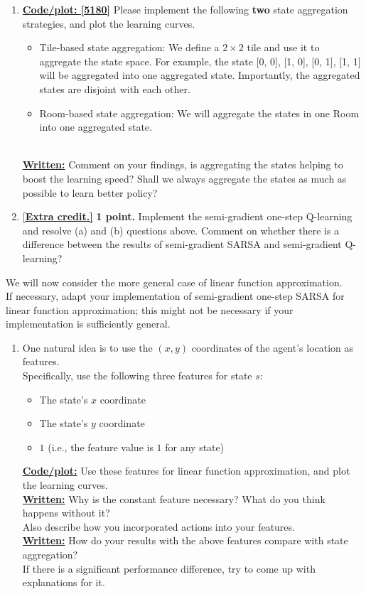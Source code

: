 \documentclass{article}
\begin{document}
\begin{enumerate}
\begin{enumerate}
\item \uline{\textbf{Code/plot: [5180]}} Please implement the following \textbf{two} state aggregation strategies, and plot the learning curves. \\
\begin{itemize}
    \item Tile-based state aggregation: We define a $2 \times 2$ tile and use it to aggregate the state space. For example, the state [0, 0], [1, 0], [0, 1], [1, 1] will be aggregated into one aggregated state. Importantly, the aggregated states are disjoint with each other. 
    \item Room-based state aggregation: We will aggregate the states in one Room into one aggregated state. 
\end{itemize} \\
\uline{\textbf{Written:}} Comment on your findings, is aggregating the states helping to boost the learning speed? Shall we always aggregate the states as much as possible to learn better policy?

\item \uline{[\textbf{Extra credit.]}} \textbf{1 point.} Implement the semi-gradient one-step Q-learning and resolve (a) and (b) questions above. Comment on whether there is a difference between the results of semi-gradient SARSA and semi-gradient Q-learning? 

\end{enumerate}
\vspace{20pt}

We will now consider the more general case of linear function approximation. \\
If necessary, adapt your implementation of semi-gradient one-step SARSA for linear function approximation; this might not be necessary if your implementation is sufficiently general.
\begin{enumerate}[resume]
\item  One natural idea is to use the $(x, y)$ coordinates of the agent's location as features. \\
Specifically, use the following three features for state $s$:
\begin{itemize}
\item The state's $x$ coordinate
\item The state's $y$ coordinate
\item $1$ (i.e., the feature value is $1$ for any state)
\end{itemize}
\uline{\textbf{Code/plot:}} Use these features for linear function approximation, and plot the learning curves. \\
\uline{\textbf{Written:}} Why is the constant feature necessary? What do you think happens without it? \\
Also describe how you incorporated actions into your features. \\
\uline{\textbf{Written:}} How do your results with the above features compare with state aggregation? \\
If there is a significant performance difference, try to come up with explanations for it.


\end{enumerate}
\end{enumerate}
\end{document}
